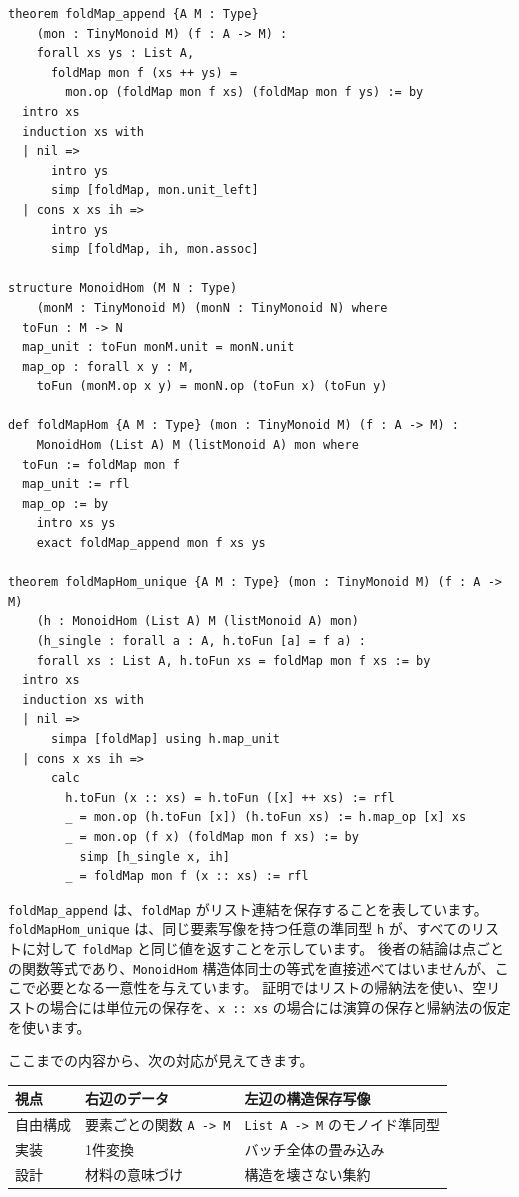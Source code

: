 \begin{listing}[htbp]
\begin{verbatim}
theorem foldMap_append {A M : Type}
    (mon : TinyMonoid M) (f : A -> M) :
    forall xs ys : List A,
      foldMap mon f (xs ++ ys) =
        mon.op (foldMap mon f xs) (foldMap mon f ys) := by
  intro xs
  induction xs with
  | nil =>
      intro ys
      simp [foldMap, mon.unit_left]
  | cons x xs ih =>
      intro ys
      simp [foldMap, ih, mon.assoc]

structure MonoidHom (M N : Type)
    (monM : TinyMonoid M) (monN : TinyMonoid N) where
  toFun : M -> N
  map_unit : toFun monM.unit = monN.unit
  map_op : forall x y : M,
    toFun (monM.op x y) = monN.op (toFun x) (toFun y)

def foldMapHom {A M : Type} (mon : TinyMonoid M) (f : A -> M) :
    MonoidHom (List A) M (listMonoid A) mon where
  toFun := foldMap mon f
  map_unit := rfl
  map_op := by
    intro xs ys
    exact foldMap_append mon f xs ys

theorem foldMapHom_unique {A M : Type} (mon : TinyMonoid M) (f : A -> M)
    (h : MonoidHom (List A) M (listMonoid A) mon)
    (h_single : forall a : A, h.toFun [a] = f a) :
    forall xs : List A, h.toFun xs = foldMap mon f xs := by
  intro xs
  induction xs with
  | nil =>
      simpa [foldMap] using h.map_unit
  | cons x xs ih =>
      calc
        h.toFun (x :: xs) = h.toFun ([x] ++ xs) := rfl
        _ = mon.op (h.toFun [x]) (h.toFun xs) := h.map_op [x] xs
        _ = mon.op (f x) (foldMap mon f xs) := by
          simp [h_single x, ih]
        _ = foldMap mon f (x :: xs) := rfl
\end{verbatim}
\caption{\texttt{foldMap\_append}・\texttt{foldMapHom\_unique}}
\label{lst:ch37_foldmap_hom}
\end{listing}

\texttt{foldMap\_append} は、\texttt{foldMap} がリスト連結を保存することを表しています。
\texttt{foldMapHom\_unique} は、同じ要素写像を持つ任意の準同型 \texttt{h} が、すべてのリストに対して \texttt{foldMap} と同じ値を返すことを示しています。
後者の結論は点ごとの関数等式であり、\texttt{MonoidHom} 構造体同士の等式を直接述べてはいませんが、ここで必要となる一意性を与えています。
証明ではリストの帰納法を使い、空リストの場合には単位元の保存を、\texttt{x :: xs} の場合には演算の保存と帰納法の仮定を使います。

ここまでの内容から、次の対応が見えてきます。

\begin{center}
\begin{tabular}{lll}
\toprule
視点 & 右辺のデータ & 左辺の構造保存写像 \\
\midrule
自由構成 & 要素ごとの関数 \texttt{A -> M} & \texttt{List A -> M} のモノイド準同型 \\
実装 & 1件変換 & バッチ全体の畳み込み \\
設計 & 材料の意味づけ & 構造を壊さない集約 \\
\bottomrule
\end{tabular}
\end{center}

